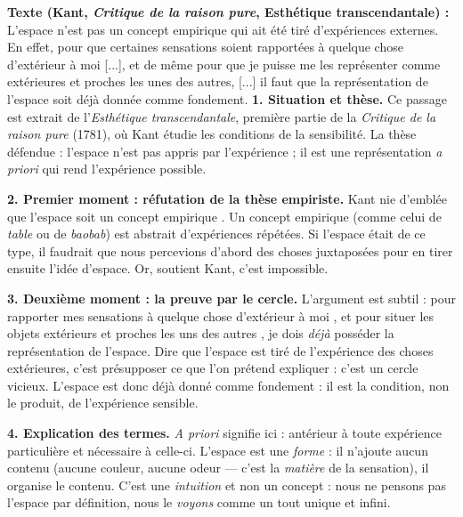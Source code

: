 \documentclass[11pt]{article}
\begin{document}
\begin{exoresolu}
\textbf{Texte (Kant, \emph{Critique de la raison pure}, Esthétique transcendantale) :} \guillemotleft L'espace n'est pas un concept empirique qui ait été tiré d'expériences externes. En effet, pour que certaines sensations soient rapportées à quelque chose d'extérieur à moi [...], et de même pour que je puisse me les représenter comme extérieures et proches les unes des autres, [...] il faut que la représentation de l'espace soit déjà donnée comme fondement. \guillemotright
\tcblower
\textbf{1. Situation et thèse.} Ce passage est extrait de l'\emph{Esthétique transcendantale}, première partie de la \emph{Critique de la raison pure} (1781), où Kant étudie les conditions de la sensibilité. La thèse défendue : l'espace n'est pas appris par l'expérience ; il est une représentation \emph{a priori} qui rend l'expérience possible.

\textbf{2. Premier moment : réfutation de la thèse empiriste.} Kant nie d'emblée que l'espace soit un \guillemotleft concept empirique \guillemotright. Un concept empirique (comme celui de \emph{table} ou de \emph{baobab}) est abstrait d'expériences répétées. Si l'espace était de ce type, il faudrait que nous percevions d'abord des choses juxtaposées pour en tirer ensuite l'idée d'espace. Or, soutient Kant, c'est impossible.

\textbf{3. Deuxième moment : la preuve par le cercle.} L'argument est subtil : pour rapporter mes sensations à \guillemotleft quelque chose d'extérieur à moi \guillemotright, et pour situer les objets \guillemotleft extérieurs et proches les uns des autres \guillemotright, je dois \emph{déjà} posséder la représentation de l'espace. Dire que l'espace est tiré de l'expérience des choses extérieures, c'est présupposer ce que l'on prétend expliquer : c'est un cercle vicieux. L'espace est donc \guillemotleft déjà donné comme fondement \guillemotright : il est la condition, non le produit, de l'expérience sensible.

\textbf{4. Explication des termes.} \emph{A priori} signifie ici : antérieur à toute expérience particulière et nécessaire à celle-ci. L'espace est une \emph{forme} : il n'ajoute aucun contenu (aucune couleur, aucune odeur --- c'est la \emph{matière} de la sensation), il organise le contenu. C'est une \emph{intuition} et non un concept : nous ne pensons pas l'espace par définition, nous le \emph{voyons} comme un tout unique et infini.


\end{exoresolu}
\end{document}
